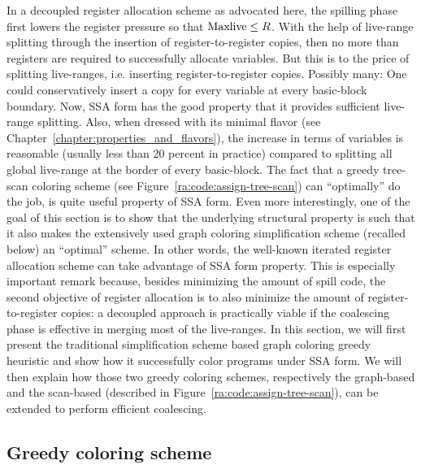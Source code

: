 {In a decoupled register allocation scheme as advocated here, the spilling phase first lowers the register pressure so that $\mathrm{Maxlive} \leq R$.
With the help of live-range splitting through the insertion of register-to-register copies, then no more than \regs registers are required to successfully allocate variables.
But this is to the price of splitting live-ranges, i.e. inserting register-to-register copies.
Possibly many:
One could conservatively insert a copy for every variable at every basic-block boundary.
Now, SSA form has the good property that it provides sufficient live-range splitting.
Also, when dressed with its minimal flavor (see Chapter~\ref{chapter:properties_and_flavors}), the increase in terms of variables is reasonable (usually less than 20 percent in practice) compared to splitting all global live-range at the border of every basic-block.
The fact that a greedy tree-scan coloring scheme (see Figure~\ref{ra:code:assign-tree-scan}) can ``optimally'' do the job, is quite useful property of SSA form.
Even more interestingly, one of the goal of this section is to show that the underlying structural property is such that it also makes the extensively used graph coloring simplification scheme (recalled below) an ``optimal'' scheme.
In other words, the well-known iterated register allocation scheme can take advantage of SSA form property.
This is especially important remark because, besides minimizing the amount of spill code, the second objective of register allocation is to also minimize the amount of register-to-register copies:
a decoupled approach is practically viable if the coalescing phase is effective in merging most of the live-ranges.
In this section, we will first present the traditional simplification scheme based graph coloring greedy heuristic and show how it successfully color programs under SSA form.
We will then explain how those two greedy coloring schemes, respectively the graph-based and the scan-based (described in Figure~\ref{ra:code:assign-tree-scan}), can be extended to perform efficient coalescing.

 

\subsection{Greedy coloring scheme}
\label{sec:ra:greedy-col}

}
